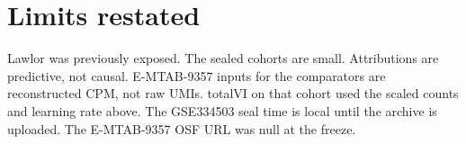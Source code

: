 \documentclass[10pt,a4paper]{article}
\begin{document}
\section{Limits restated}
Lawlor was previously exposed. The sealed cohorts are small. Attributions are predictive, not causal. E-MTAB-9357 inputs for the comparators are reconstructed CPM, not raw UMIs. totalVI on that cohort used the scaled counts and learning rate above. The GSE334503 seal time is local until the archive is uploaded. The E-MTAB-9357 OSF URL was null at the freeze.
\end{document}

